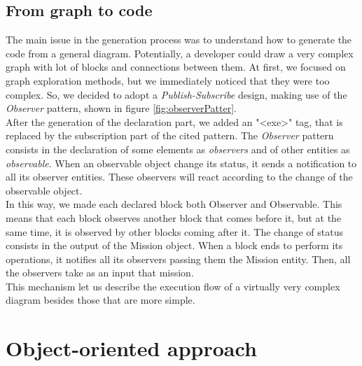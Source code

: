 \subsection{From graph to code}\label{graphGen}

The main issue in the generation process was to understand how to generate the code from a general diagram. Potentially, a developer could draw a very complex graph with lot of blocks and connections between them.
At first,  we focused on graph exploration methods, but we immediately noticed that they were too complex.
So, we decided to adopt a \textit{Publish-Subscribe} design, making use of the \textit{Observer} pattern, shown in figure \ref{fig:observerPatter}.
\\


After the generation of the declaration part, we added an "<exe>" tag, that is replaced by the subscription part of the cited pattern. 
The \textit{Observer} pattern consists in the declaration of some elements as \textit{observers} and of other entities as \textit{observable}. 
When an observable object change its status, it sends a notification to all its observer entities. 
These observers will react according to the change of the observable object.
\\

In this way, we made each declared block both Observer and Observable. 
This means that each block observes another block that comes before it, but at the same time, it is observed by other blocks coming after it. 
The change of status consists in the output of the Mission object.
When a block ends to perform its operations, it notifies all its observers passing them the Mission entity. 
Then, all the observers take as an input that mission.
\\

This mechanism let us describe the execution flow of a virtually very complex diagram besides those that are more simple.


\section{Object-oriented approach}\label{oomodel}

